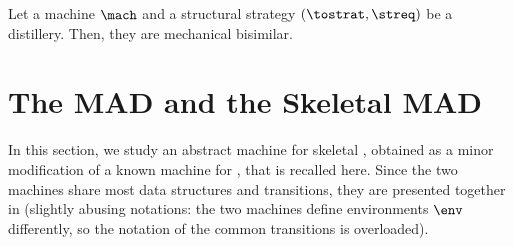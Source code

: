 \begin{toappendix}
\begin{theorem}
\label{thm:abs-impl}
  Let a machine $\mach$ and a structural strategy $(\tostrat,\streq)$ be a distillery.  Then, they are mechanical bisimilar.
\end{theorem}
\end{toappendix}


\section{The MAD and the Skeletal MAD}
\label{sect:skeletal-MAD}
In this section, we study an abstract machine for skeletal \cbneed, obtained as a minor modification of a known machine for \cbneed, that is recalled here. Since the two machines share most data structures and transitions, they are presented together in  (slightly abusing notations: the two machines define environments $\env$ differently, so the notation of the common transitions is overloaded).



